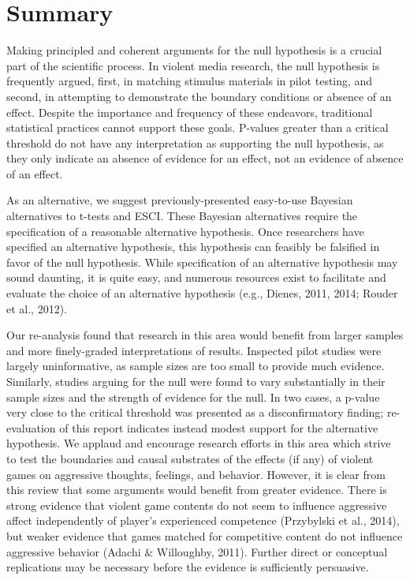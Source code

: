 \documentclass[fignum,nobf,man]{apa}
\begin{document}
\section{Summary} %
Making principled and coherent arguments for the null hypothesis is a crucial part of the scientific process. In violent media research, the null hypothesis is frequently argued, first, in matching stimulus materials in pilot testing, and second, in attempting to demonstrate the boundary conditions or absence of an effect. Despite the importance and frequency of these endeavors, traditional statistical practices cannot support these goals. P-values greater than a critical threshold do not have any interpretation as supporting the null hypothesis, as they only indicate an absence of evidence for an effect, not an evidence of absence of an effect.

As an alternative, we suggest previously-presented easy-to-use Bayesian alternatives to t-tests and ESCI. These Bayesian alternatives require the specification of a reasonable alternative hypothesis. Once researchers have specified an alternative hypothesis, this hypothesis can feasibly be falsified in favor of the null hypothesis. While specification of an alternative hypothesis may sound daunting, it is quite easy, and numerous resources exist to facilitate and evaluate the choice of an alternative hypothesis (e.g., Dienes, 2011, 2014; Rouder et al., 2012).

Our re-analysis found that research in this area would benefit from larger samples and more finely-graded interpretations of results. Inspected pilot studies were largely uninformative, as sample sizes are too small to provide much evidence. Similarly, studies arguing for the null were found to vary substantially in their sample sizes and the strength of evidence for the null. In two cases, a p-value very close to the critical threshold was presented as a disconfirmatory finding; re-evaluation of this report indicates instead modest support for the alternative hypothesis. We applaud and encourage research efforts in this area which strive to test the boundaries and causal substrates of the effects (if any) of violent games on aggressive thoughts, feelings, and behavior. However, it is clear from this review that some arguments would benefit from greater evidence. There is strong evidence that violent game contents do not seem to influence aggressive affect independently of player’s experienced competence (Przybylski et al., 2014), but weaker evidence that games matched for competitive content do not influence aggressive behavior (Adachi \& Willoughby, 2011). Further direct or conceptual replications may be necessary before the evidence is sufficiently persuasive. 
\end{document}
